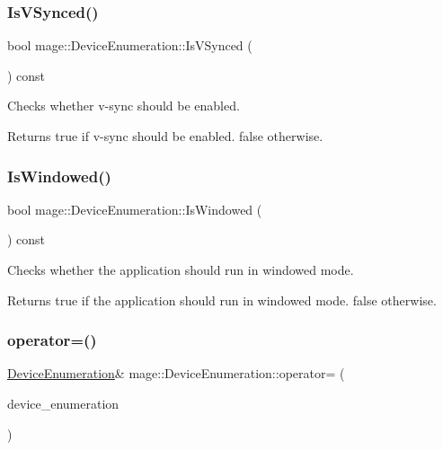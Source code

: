 \subsubsection{\texorpdfstring{Is\+V\+Synced()}{IsVSynced()}}
{\footnotesize\ttfamily bool mage\+::\+Device\+Enumeration\+::\+Is\+V\+Synced (\begin{DoxyParamCaption}{ }\end{DoxyParamCaption}) const}

Checks whether v-\/sync should be enabled.

\begin{DoxyReturn}{Returns}
{\ttfamily true} if v-\/sync should be enabled. {\ttfamily false} otherwise. 
\end{DoxyReturn}
\hypertarget{classmage_1_1_device_enumeration_a51479c8c85b286f78730c5622604e524}{}\label{classmage_1_1_device_enumeration_a51479c8c85b286f78730c5622604e524} 
\subsubsection{\texorpdfstring{Is\+Windowed()}{IsWindowed()}}
{\footnotesize\ttfamily bool mage\+::\+Device\+Enumeration\+::\+Is\+Windowed (\begin{DoxyParamCaption}{ }\end{DoxyParamCaption}) const}

Checks whether the application should run in windowed mode.

\begin{DoxyReturn}{Returns}
{\ttfamily true} if the application should run in windowed mode. {\ttfamily false} otherwise. 
\end{DoxyReturn}
\hypertarget{classmage_1_1_device_enumeration_a03e3affa2b8bb4837cffda7b11389bea}{}\label{classmage_1_1_device_enumeration_a03e3affa2b8bb4837cffda7b11389bea} 
\subsubsection{\texorpdfstring{operator=()}{operator=()}\hspace{0.1cm}{\footnotesize\ttfamily [1/2]}}
{\footnotesize\ttfamily \hyperlink{classmage_1_1_device_enumeration}{Device\+Enumeration}\& mage\+::\+Device\+Enumeration\+::operator= (\begin{DoxyParamCaption}\item[{const \hyperlink{classmage_1_1_device_enumeration}{Device\+Enumeration} \&}]{device\+\_\+enumeration }\end{DoxyParamCaption})\hspace{0.3cm}{\ttfamily [delete]}}

